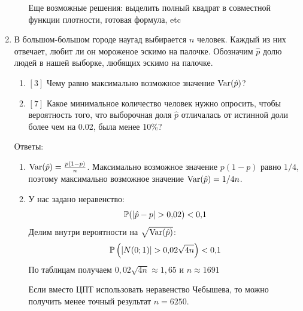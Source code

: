 \documentclass[12pt, a4paper]{article}\usepackage[]{graphicx}\usepackage[]{color}
\begin{document}
\begin{enumerate}
\begin{enumerate}
				Еще возможные решения: выделить полный квадрат в совместной функции плотности, готовая формула, etc

			\end{enumerate}



			\item В большом-большом городе наугад выбирается $n$ человек. Каждый из них отвечает, любит ли он мороженое эскимо на палочке. Обозначим $\hat{p}$ долю людей в нашей выборке, любящих эскимо на палочке.
			\begin{enumerate}
				\item $[3]$ Чему равно максимально возможное значение $\Var(\hat{p})$?
				\item $[7]$ Какое минимальное количество человек нужно опросить, чтобы вероятность того, что выборочная доля $\hat{p}$ отличалась от истинной доли более чем на 0.02, была менее 10\%?
			\end{enumerate}


			Ответы:
			\begin{enumerate}
				\item $\Var(\hat{p})=\frac{p(1-p)}{n}$. Максимально возможное значение $p(1-p)$ равно $1/4$, поэтому максимально возможное значение $\Var(\hat{p})=1/4n$.
				\item У нас задано неравенство:
				\begin{equation}
				\P(|\hat{p}-p|>0{,}02)<0{,}1
				\end{equation}
				Делим внутри вероятности на $\sqrt{\Var(\hat{p})}$:
				\begin{equation}
				\P\left( |N(0;1)| > 0{,}02\sqrt{4n} \right)<0{,}1
				\end{equation}
				По таблицам получаем $0{,}02\sqrt{4n}\approx 1{,}65$ и $n\approx 1691$


				Если вместо ЦПТ использовать неравенство Чебышева, то можно получить менее точный результат $n=6250$.


\end{enumerate}
\end{enumerate}
\end{document}
